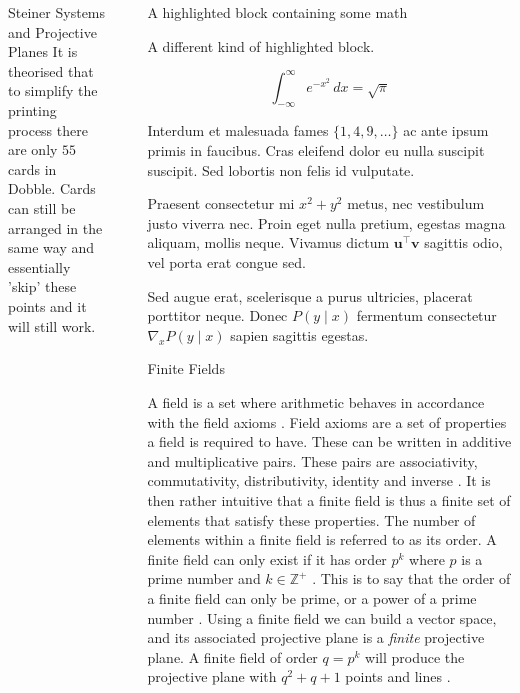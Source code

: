 \documentclass[final]{beamer}
\newlength{\sepwidth}
\newlength{\colwidth}
\newcommand{\separatorcolumn}{\begin{column}{\sepwidth}\end{column}}
\begin{document}
\begin{frame}[t]
\begin{columns}[t]
\begin{column}{\colwidth}
\begin{block}{Steiner Systems and Projective Planes}
    It is theorised that to simplify the printing process there are only $55$ cards in Dobble. Cards can still be arranged in the same way and essentially 'skip' these points and it will still work. 
\end{block}
\end{column}

\separatorcolumn

\begin{column}{\colwidth}

  \begin{exampleblock}{A highlighted block containing some math}

    A different kind of highlighted block.

    $$
    \int_{-\infty}^{\infty} e^{-x^2}\,dx = \sqrt{\pi}
    $$

    Interdum et malesuada fames $\{1, 4, 9, \ldots\}$ ac ante ipsum primis in
    faucibus. Cras eleifend dolor eu nulla suscipit suscipit. Sed lobortis non
    felis id vulputate.


    Praesent consectetur mi $x^2 + y^2$ metus, nec vestibulum justo viverra
    nec. Proin eget nulla pretium, egestas magna aliquam, mollis neque. Vivamus
    dictum $\mathbf{u}^\intercal\mathbf{v}$ sagittis odio, vel porta erat
    congue sed. 


    Sed augue erat, scelerisque a purus ultricies, placerat porttitor neque.
    Donec $P(y \mid x)$ fermentum consectetur $\nabla_x P(y \mid x)$ sapien
    sagittis egestas.

  \end{exampleblock}

  \begin{block}{Finite Fields}

      A field is a set where arithmetic behaves in accordance with the field axioms \cite{Weisstein2023b}. Field axioms are a set of properties a field is required to have. These can be written in additive and multiplicative pairs. These pairs are associativity, commutativity, distributivity, identity and inverse \cite{Weisstein2023}. It is then rather intuitive that a finite field is thus a finite set of elements that satisfy these properties. The number of elements within a finite field is referred to as its order. A finite field can only exist if it has order $p^k$ where $p$ is a prime number and $k\in\mathbb{Z}^+$ \cite{cameron2000}. This is to say that the order of a finite field can only be prime, or a power of a prime number \cite{cameron2000}. Using a finite field we can build a vector space, and its associated projective plane is a \emph{finite} projective plane. A finite field of order $q=p^k$ will produce the projective plane with $q^2+q+1$ points and lines \cite{Collingridge2018}.
      

\end{block}
\end{column}
\end{columns}
\end{frame}
\end{document}
